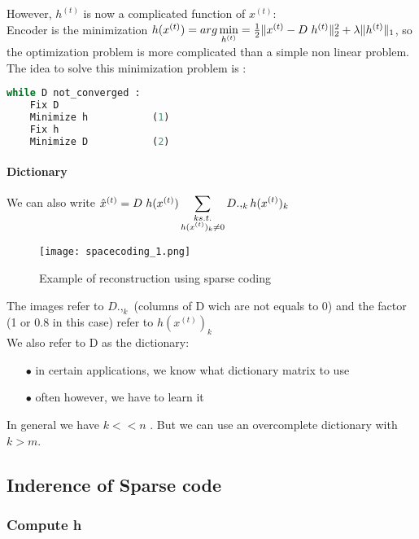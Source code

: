 \documentclass[a4paper,10pt]{article}
\begin{document}
However, $h^{(t)}$ is now a complicated function of $x^{(t)}$:\\
Encoder is the minimization $h(x^{(t)}) = arg\min\limits_{h^{(t)}}= \frac{1}{2} \| x^{(t)} - D \hspace{3px} h^{(t)} \|_2^2 + \lambda \|h^{(t)} \|_1$, so the optimization problem is more complicated than a simple non linear problem.\\
The idea to solve this minimization problem is \cite{NIPS2006_2979} :

\begin{lstlisting}[language=Python,frame=single]
while D not_converged :
    Fix D
    Minimize h           (1)
    Fix h 
    Minimize D           (2)
\end{lstlisting}


\paragraph{Dictionary}
We can also write $\hat{x}^{(t)} = D\hspace{3px} h(x^{(t)}) \displaystyle\sum_{\substack{k s.t.\\ h(x^{(t)})_k\neq 0}}  D.,_k h(x^{(t)} )_k$
\begin{figure}[h]
 \centering
 \texttt{[image: spacecoding\_1.png]}
  \caption{Example of reconstruction using sparse coding}
\end{figure}

The images refer to $D.,_k$ (columns of D wich are not equals to 0) and the factor (1 or 0.8 in this case) refer to $h(x^{(t)} )_k$
\\We also refer to D as the dictionary:
\begin{itemize}
 \item[$\bullet$]in certain applications, we know what dictionary matrix to use
 \item[$\bullet$]often however, we have to learn it
\end{itemize}

In general we have $k<<n$ . But we can use an overcomplete dictionary with $k > m$.
\subsection{Inderence of Sparse code}
\subsubsection{Compute h}
\end{document}
